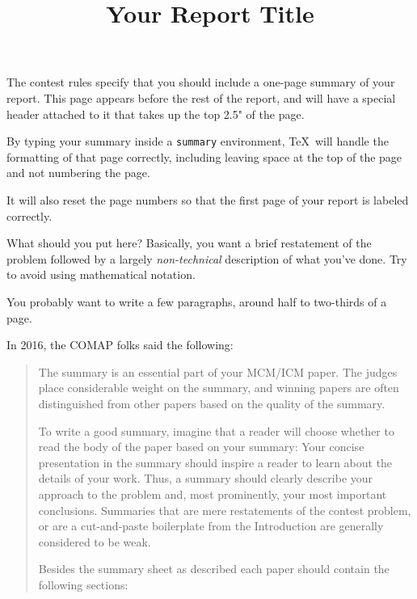 \documentclass{icmmcm}
\title{Your Report Title}
\begin{document}
\newcommand{\tabincell}[2]{\begin{tabular}{@{}#1@{}}#2\end{tabular}}

\begin{summary}
  The contest rules specify that you should include a one-page summary
  of your report.  This page appears before the rest of the report,
  and will have a special header attached to it that takes up the top
  2.5" of the page.

  By typing your summary inside a \texttt{summary} environment, \TeX\ will
  handle the formatting of that page correctly, including leaving
  space at the top of the page and not numbering the page.

  It will also reset the page numbers so that the first page of your
  report is labeled correctly.

  What should you put here?  Basically, you want a brief restatement
  of the problem followed by a largely \emph{non-technical}
  description of what you've done.  Try to avoid using mathematical
  notation.

  You probably want to write a few paragraphs, around half to
  two-thirds of a page.

  In 2016, the COMAP folks said the following:
  \begin{quotation}
    The summary is an essential part of your MCM/ICM paper. The
    judges place considerable weight on the summary, and winning
    papers are often distinguished from other papers based on the
    quality of the summary.

    To write a good summary, imagine that a reader will choose
    whether to read the body of the paper based on your summary:
    Your concise presentation in the summary should inspire a
    reader to learn about the details of your work. Thus, a
    summary should clearly describe your approach to the problem
    and, most prominently, your most important conclusions.
    Summaries that are mere restatements of the contest problem,
    or are a cut-and-paste boilerplate from the Introduction are
    generally considered to be weak.

    Besides the summary sheet as described each paper should
    contain the following sections:


\end{quotation}
\end{summary}
\end{document}
